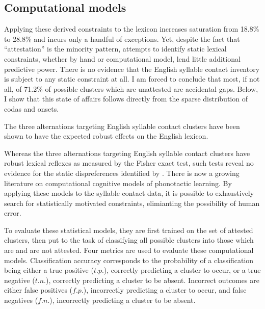 \subsection{Computational models}

Applying these derived constraints to the lexicon increases saturation from 18.8\% to 28.8\% and incurs only a handful of exceptions. Yet, despite the fact that ``attestation'' is the minority pattern, attempts to identify static lexical constraints, whether by hand or computational model, lend little additional predictive power. There is no evidence that the English syllable contact inventory is subject to any static constraint at all. I am forced to conclude that most, if not all, of 71.2\% of possible clusters which are unattested are accidental gaps. Below, I show that this state of affairs follows directly from the sparse distribution of codas and onsets. 

The three alternations targeting English syllable contact clusters have been shown to have the expected robust effects on the English lexicon. 

Whereas the three alternations targeting English syllable contact clusters have robust lexical reflexes as measured by the Fisher exact test, such tests reveal no evidence for the static dispreferences identified by \citeauthor{Pierrehumbert1994}. There is now a growing literature on computational cognitive models of phonotactic learning. By applying these models to the syllable contact data, it is possible to exhaustively search for statistically motivated constraints, elimianting the possibility of human error. 

To evaluate these statistical models, they are first trained on the set of attested clusters, then put to the task of classifying all possible clusters into those which are and are not attested. Four metrics are used to evaluate these computational models. Classification accuracy corresponds to the probability of a classification being either a true positive ($t.p.$), correctly predicting a cluster to occur, or a true negative ($t.n.$), correctly predicting a cluster to be absent. Incorrect outcomes are either false positives ($f.p.$), incorrectly predicting a cluster to occur, and false negatives ($f.n.$), incorrectly predicting a cluster to be absent. 


